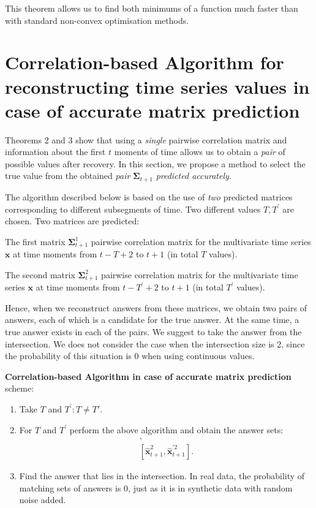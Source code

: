 \documentclass[12pt]{article}
\begin{document}
{This theorem allows us to find both minimums of a function much faster than with standard non-convex optimisation methods.

\section{Correlation-based Algorithm for reconstructing time series values in case of accurate matrix prediction}

Theorems 2 and 3 show that using a \emph{single} pairwise correlation matrix and information about the first $t$ moments of time allows us to obtain a \emph{pair} of possible values after recovery. In this section, we propose a method to select the true value from the obtained \emph{pair} $\mathbf{\Sigma}_{t+1}$ \emph{predicted accurately}.

The algorithm described below is based on the use of \emph{two} predicted matrices corresponding to different subsegments of time. Two different values $T, T^\prime$ are chosen. Two matrices are predicted:

The first matrix $\mathbf{\Sigma}_{t+1}^1$ pairwise correlation matrix for the multivariate time series $\mathbf{x}$ at time moments from $t-T+2$ to $t+1$ (in total $T$ values).

The second matrix $\mathbf{\Sigma}_{t+1}^2$ pairwise correlation matrix for the multivariate time series $\mathbf{x}$ at time moments from $t-T^\prime+2$ to $t+1$ (in total $T^\prime$ values).

Hence, when we reconstruct answers from these matrices, we obtain two pairs of answers, each of which is a candidate for the true answer. At the same time, a true answer exists in each of the pairs. We suggest to take the answer from the intersection. We does not consider the case when the intersection size is 2, since the probability of this situation is 0 when using continuous values.

\textbf{Correlation-based Algorithm in case of accurate matrix prediction} scheme:
\begin{enumerate}
	\item Take $T$ and $T^\prime: T \neq T'$.
	\item For $T$ and $T^\prime$ perform the above algorithm and obtain the answer sets: 
	\begin{gather*}
	 [\hat{\mathbf{x}}_{t+1}^1, \hat{\mathbf{x}}^{\prime 1}_{t+1}],\\ [\hat{\mathbf{x}}_{t+1}^2, \hat{\mathbf{x}}^{\prime 2}_{t+1}].
	 \end{gather*}
	\item Find the answer that lies in the intersection.
	In real data, the probability of matching sets of answers is 0, just as it is in synthetic data with random noise added.
\end{enumerate}

}
\end{document}
